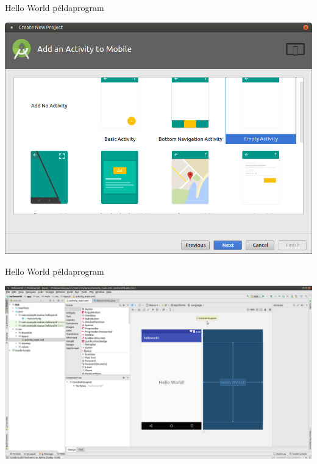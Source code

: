 \documentclass{beamer}
\begin{document}
\begin{frame}[fragile]{Hello World példaprogram}
	\begin{minipage}{1\textwidth}
		\centering
		\includegraphics[width=1\linewidth]{figures/hw2.png}
	\end{minipage}
\end{frame}
\begin{frame}[fragile]{Hello World példaprogram}
	\begin{minipage}{1\textwidth}
		\centering
		\includegraphics[width=1\linewidth]{figures/h3.png}
	\end{minipage}
\end{frame}
\end{document}

